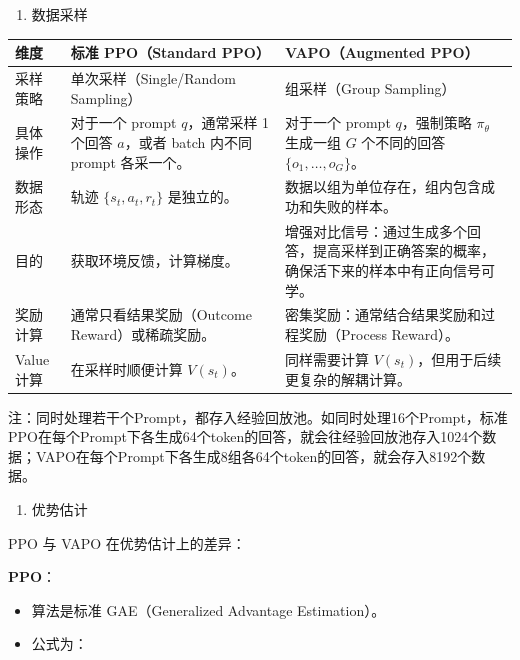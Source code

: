 \begin{enumerate}
\def\labelenumi{\arabic{enumi}.}
\setcounter{enumi}{1}
\tightlist
\item
  数据采样
\end{enumerate}

\begin{longtable}[]{@{}
  >{\raggedright\arraybackslash}p{}
  >{\raggedright\arraybackslash}p{}
  >{\raggedright\arraybackslash}p{}@{}}
\toprule
维度 & 标准 PPO（Standard PPO） & VAPO（Augmented PPO） \\
\midrule
\endhead
采样策略 & 单次采样（Single/Random Sampling） & 组采样（Group Sampling） \\
具体操作 & 对于一个 prompt \(q\)，通常采样 1 个回答 \(a\)，或者 batch 内不同 prompt 各采一个。 & 对于一个 prompt \(q\)，强制策略 \(\pi_\theta\) 生成一组 \(G\) 个不同的回答 \(\{o_1,\ldots,o_G\}\)。 \\
数据形态 & 轨迹 \(\{s_t,a_t,r_t\}\) 是独立的。 & 数据以组为单位存在，组内包含成功和失败的样本。 \\
目的 & 获取环境反馈，计算梯度。 & 增强对比信号：通过生成多个回答，提高采样到正确答案的概率，确保活下来的样本中有正向信号可学。 \\
奖励计算 & 通常只看结果奖励（Outcome Reward）或稀疏奖励。 & 密集奖励：通常结合结果奖励和过程奖励（Process Reward）。 \\
Value 计算 & 在采样时顺便计算 \(V(s_t)\)。 & 同样需要计算 \(V(s_t)\)，但用于后续更复杂的解耦计算。 \\
\bottomrule
\end{longtable}

注：同时处理若干个Prompt，都存入经验回放池。如同时处理16个Prompt，标准PPO在每个Prompt下各生成64个token的回答，就会往经验回放池存入1024个数据；VAPO在每个Prompt下各生成8组各64个token的回答，就会存入8192个数据。

\begin{enumerate}
\def\labelenumi{\arabic{enumi}.}
\setcounter{enumi}{2}
\tightlist
\item
  优势估计
\end{enumerate}

PPO 与 VAPO 在优势估计上的差异：

\textbf{PPO}：

\begin{itemize}
\tightlist
\item
  算法是标准 GAE（Generalized Advantage Estimation）。
\item
  公式为：
\end{itemize}

